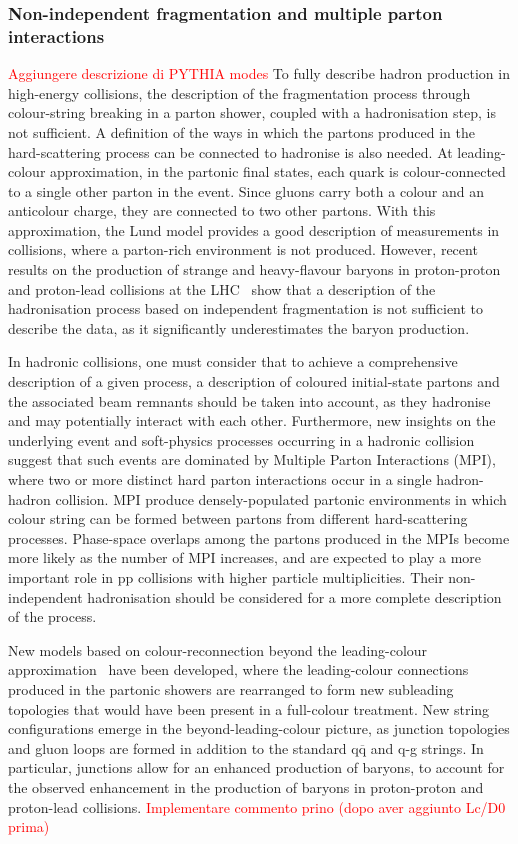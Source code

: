 \subsubsection{Non-independent fragmentation and multiple parton interactions}
\textcolor{red}{Aggiungere descrizione di PYTHIA modes}
To fully describe hadron production in high-energy collisions, the description of the fragmentation process through colour-string breaking in a parton shower, coupled with a hadronisation step, is not sufficient. A definition of the ways in which the partons produced in the hard-scattering process can be connected to hadronise is also needed. At leading-colour approximation, in the partonic final states, each quark is colour-connected to a single other parton in the event. Since gluons carry both a colour and an anticolour charge, they are connected to two other partons. With this approximation, the Lund model provides a good description of measurements in \ee collisions, where a parton-rich environment is not produced. However, recent results on the production of strange and heavy-flavour baryons in proton-proton and proton-lead collisions at the LHC~\cite{ALICE:2022exq,ALICE:2024ozd} show that a description of the hadronisation process based on independent fragmentation is not sufficient to describe the data, as it significantly underestimates the baryon production.

In hadronic collisions, one must consider that to achieve a comprehensive description of a given process, a description of coloured initial-state partons and the associated beam remnants should be taken into account, as they hadronise and may potentially interact with each other. Furthermore, new insights on the underlying event and soft-physics processes occurring in a hadronic collision suggest that such events are dominated by Multiple Parton Interactions (MPI), where two or more distinct hard parton interactions occur in a single hadron-hadron collision. MPI produce densely-populated partonic environments in which colour string can be formed between partons from different hard-scattering processes. Phase-space overlaps among the partons produced in the MPIs become more likely as the number of MPI increases, and are expected to play a more important role in pp collisions with higher particle multiplicities. Their non-independent hadronisation should be considered for a more complete description of the process. 

New models based on colour-reconnection beyond the leading-colour approximation~\cite{Christiansen:2015yqa} have been developed, where the leading-colour connections produced in the partonic showers are rearranged to form new subleading topologies that would have been present in a full-colour treatment. New string configurations emerge in the beyond-leading-colour picture, as junction topologies and gluon loops are formed in addition to the standard $\mathrm{q\overline{q}}$ and q-g strings. In particular, junctions allow for an enhanced production of baryons, to account for the observed enhancement in the production of baryons in proton-proton and proton-lead collisions.
\textcolor{red}{Implementare commento prino (dopo aver aggiunto Lc/D0 prima)}

